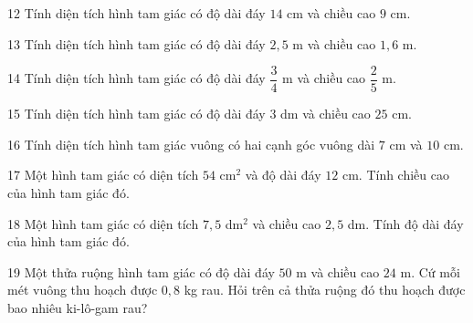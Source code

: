 \gap
\begin{probbox}{12}{\relax}
Tính diện tích hình tam giác có độ dài đáy $14$ cm và chiều cao $9$ cm.
\end{probbox}
\gap
\begin{probbox}{13}{\relax}
Tính diện tích hình tam giác có độ dài đáy $2{,}5$ m và chiều cao $1{,}6$ m.
\end{probbox}
\gap
\begin{probbox}{14}{\relax}
Tính diện tích hình tam giác có độ dài đáy $\dfrac34$ m và chiều cao $\dfrac25$ m.
\end{probbox}
\gap
\begin{probbox}{15}{\relax}
Tính diện tích hình tam giác có độ dài đáy $3$ dm và chiều cao $25$ cm.
\end{probbox}
\gap
\begin{probbox}{16}{\relax}
Tính diện tích hình tam giác vuông có hai cạnh góc vuông dài $7$ cm và $10$ cm.
\end{probbox}
\gap
\begin{probbox}{17}{\relax}
Một hình tam giác có diện tích $54$ cm$^2$ và độ dài đáy $12$ cm. Tính chiều cao của hình tam giác đó.
\end{probbox}
\gap
\begin{probbox}{18}{\relax}
Một hình tam giác có diện tích $7{,}5$ dm$^2$ và chiều cao $2{,}5$ dm. Tính độ dài đáy của hình tam giác đó.
\end{probbox}
\gap
\begin{probbox}{19}{\relax}
Một thửa ruộng hình tam giác có độ dài đáy $50$ m và chiều cao $24$ m. Cứ mỗi mét vuông thu hoạch được $0{,}8$ kg rau. Hỏi trên cả thửa ruộng đó thu hoạch được bao nhiêu ki-lô-gam rau?
\end{probbox}
